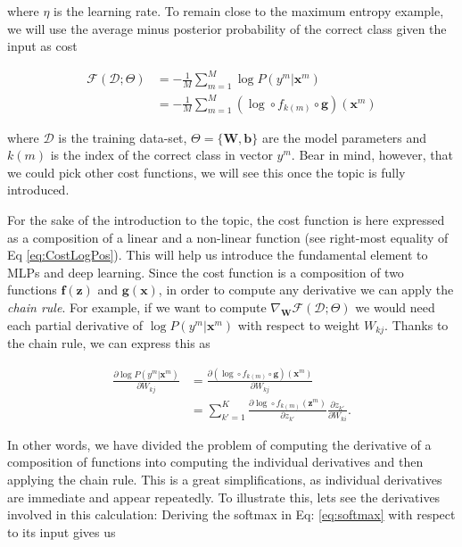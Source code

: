 where $\eta$ is the learning rate. To remain close to the maximum entropy
example, we will use the average minus posterior probability of the correct
class given the input as cost

\begin{align}
\mathcal{F}(\mathcal{D};\Theta) & = -\frac{1}{M}\sum_{m=1}^M \log P(y^m | \mathbf{x}^m) \nonumber\\&= -\frac{1}{M}\sum_{m=1}^M (\log \circ f_{k(m)} \circ \mathbf{g})(\mathbf{x}^m)
\label{eq:CostLogPos}
\end{align}
	
where $\mathcal{D}$ is the training data-set, $\Theta=\{\mathbf{W},
\mathbf{b}\}$ are the model parameters and $k(m)$ is the index of the correct
class in vector $y^m$. 
Bear in mind, however, that we could pick other cost functions, we will see
this once the topic is fully introduced.

For the sake of the introduction to the topic, the cost function is here
expressed as a composition of a linear and a non-linear function (see
right-most equality of Eq \ref{eq:CostLogPos}). This will help us introduce the
fundamental element to MLPs and deep learning. Since the cost function is a
composition of two functions  $\mathbf{f}(\mathbf{z})$ and
$\mathbf{g}(\mathbf{x})$, in order to compute any derivative we can apply the
\textit{chain rule}. For example, if we want to compute
$\nabla_\mathbf{W}\mathcal{F}(\mathcal{D};\Theta)$ we would need each partial
derivative of $\log P(y^m | \mathbf{x}^m)$ with respect to weight $W_{kj}$.
Thanks to the chain rule, we can express this as

\begin{align}
\frac{\partial \log P(y^m | \mathbf{x}^m) }{\partial W_{kj}} & = \frac{\partial (\log \circ f_{k(m)} \circ \mathbf{g})(\mathbf{x}^m) }{\partial W_{kj}} \nonumber\\& = \sum_{k'=1}^K\frac{\partial \log \circ f_{k(m)}(\mathbf{z}^m)}{\partial z_{k'}}\frac{\partial z_{k'}}{\partial W_{ki}}.
\label{eq:gradlogPycx}
\end{align}

In other words, we have divided the problem of computing the derivative of a
composition of functions into computing the individual derivatives and then
applying the chain rule. This is a great simplifications, as individual
derivatives are immediate and appear repeatedly. To illustrate this, lets see
the derivatives involved in this calculation: Deriving the softmax in Eq:
\ref{eq:softmax} with respect to its input gives us 

